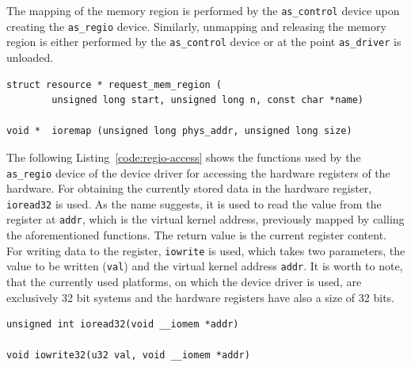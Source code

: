 The mapping of the memory region is performed by the \texttt{as\_control} device upon creating the \texttt{as\_regio} device.
Similarly, unmapping and releasing the memory region is either performed by the \texttt{as\_control} device or at the point \texttt{as\_driver} is unloaded.

\begin{lstlisting}[style=CStyle, label=code:regio-mapping, caption=Functions for allowing to access physical addresses]
struct resource * request_mem_region (
		unsigned long start, unsigned long n, const char *name)

void * 	ioremap (unsigned long phys_addr, unsigned long size)

\end{lstlisting}

The following Listing~\ref{code:regio-access} shows the functions used by the \texttt{as\_regio} device of the \asterics device driver for accessing the hardware registers of the hardware.
For obtaining the currently stored data in the hardware register, \texttt{ioread32} is used.
As the name suggests, it is used to read the value from the register at \texttt{addr}, which is the virtual kernel address, previously mapped by calling the aforementioned functions.
The return value is the current register content.
For writing data to the register, \texttt{iowrite} is used, which takes two parameters, the value to be written (\texttt{val}) and the virtual kernel address \texttt{addr}.
It is worth to note, that the currently used platforms, on which the device driver is used, are exclusively 32 bit systems and the hardware registers have also a size of 32 bits.

\begin{lstlisting}[style=CStyle, label=code:regio-access, caption=Functions for accessing hardware registers]
unsigned int ioread32(void __iomem *addr)

void iowrite32(u32 val, void __iomem *addr)

\end{lstlisting}

